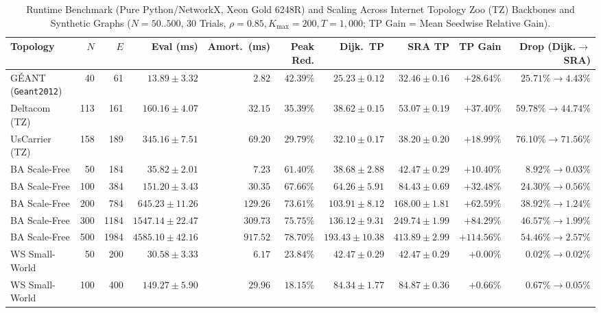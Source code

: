 \documentclass{ccjnl}
\newcommand{\rev}[1]{#1}
\def\rev#1{#1}%
\begin{document}
\begin{table}[t]
\centering
\scriptsize\setlength{\tabcolsep}{1.2pt}\renewcommand{\arraystretch}{0.95}
\caption{\rev{Runtime Benchmark (Pure Python/NetworkX, Xeon Gold 6248R) and Scaling Across Internet Topology Zoo (TZ) Backbones and Synthetic Graphs ($N=50..500$, 30 Trials, $\rho=0.85, K_{\max}=200, T=1{,}000$; TP Gain = Mean Seedwise Relative Gain).}}
\label{tab:scalability_table}
\begin{tabular*}{\textwidth}{@{\extracolsep{\fill}}lrrrrrrrrr@{}}
\toprule
\textbf{Topology} & \textbf{$N$} & \textbf{$E$} & \textbf{Eval (ms)} & \textbf{Amort.\ (ms)} & \textbf{Peak Red.} & \textbf{Dijk.\ TP} & \textbf{SRA TP} & \textbf{TP Gain} & \textbf{Drop (Dijk.$\to$SRA)} \\
\midrule
G\'EANT (\texttt{Geant2012}) & 40 & 61 & $13.89 \pm 3.32$ & $2.82$ & $42.39\%$ & $25.23 \pm 0.12$ & $32.46 \pm 0.16$ & $\mathbf{+28.64\%}$ & $25.71\% \to 4.43\%$ \\
Deltacom (TZ) & 113 & 161 & $160.16 \pm 4.07$ & $32.15$ & $35.39\%$ & $38.62 \pm 0.15$ & $53.07 \pm 0.19$ & $\mathbf{+37.40\%}$ & $59.78\% \to 44.74\%$ \\
UsCarrier (TZ) & 158 & 189 & $345.16 \pm 7.51$ & $69.20$ & $29.79\%$ & $32.10 \pm 0.17$ & $38.20 \pm 0.20$ & $\mathbf{+18.99\%}$ & $76.10\% \to 71.56\%$ \\
\midrule
BA Scale-Free & 50 & 184 & $35.82 \pm 2.01$ & $7.23$ & $61.40\%$ & $38.68 \pm 2.88$ & $42.47 \pm 0.29$ & $+10.40\%$ & $8.92\% \to 0.03\%$ \\
BA Scale-Free & 100 & 384 & $151.20 \pm 3.43$ & $30.35$ & $67.66\%$ & $64.26 \pm 5.91$ & $84.43 \pm 0.69$ & $+32.48\%$ & $24.30\% \to 0.56\%$ \\
BA Scale-Free & 200 & 784 & $645.23 \pm 11.26$ & $129.26$ & $73.61\%$ & $103.91 \pm 8.12$ & $168.00 \pm 1.81$ & $+62.59\%$ & $38.92\% \to 1.24\%$ \\
BA Scale-Free & 300 & 1184 & $1547.14 \pm 22.47$ & $309.73$ & $75.75\%$ & $136.12 \pm 9.31$ & $249.74 \pm 1.99$ & $+84.29\%$ & $46.57\% \to 1.99\%$ \\
BA Scale-Free & 500 & 1984 & $4585.10 \pm 42.16$ & $917.52$ & $78.70\%$ & $193.43 \pm 10.38$ & $413.89 \pm 2.99$ & $\mathbf{+114.56\%}$ & $\mathbf{54.46\% \to 2.57\%}$ \\
\midrule
WS Small-World & 50 & 200 & $30.58 \pm 3.33$ & $6.17$ & $23.84\%$ & $42.47 \pm 0.29$ & $42.47 \pm 0.29$ & $+0.00\%$ & $0.02\% \to 0.02\%$ \\
WS Small-World & 100 & 400 & $149.27 \pm 5.90$ & $29.96$ & $18.15\%$ & $84.34 \pm 1.77$ & $84.87 \pm 0.36$ & $+0.66\%$ & $0.67\% \to 0.05\%$ \\

\end{tabular*}
\end{table}
\end{document}
